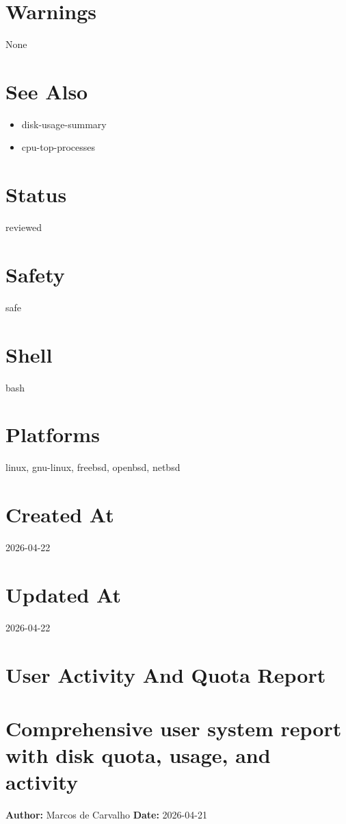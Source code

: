 \documentclass[openany]{book}
\begin{document}
\section*{Warnings}
None

\section*{See Also}
\begin{itemize}
  \item disk-usage-summary
  \item cpu-top-processes
\end{itemize}

\section*{Status}
reviewed

\section*{Safety}
safe

\section*{Shell}
bash

\section*{Platforms}
linux, gnu-linux, freebsd, openbsd, netbsd

\section*{Created At}
2026-04-22

\section*{Updated At}
2026-04-22

\section{User Activity And Quota Report}
\section*{Comprehensive user system report with disk quota, usage, and activity}
\textbf{Author:} Marcos de Carvalho \hfill \textbf{Date:} 2026-04-21
\end{document}
